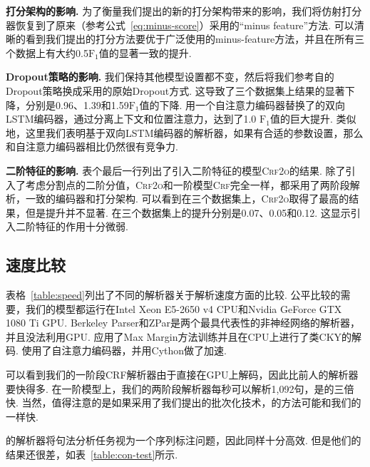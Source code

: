 \noindent\textbf{打分架构的影响.}
为了衡量我们提出的新的打分架构带来的影响，我们将仿射打分器恢复到了原来\citep{stern-etal-2017-minimal}（参考公式~\ref{eq:minus-score}）采用的``minus feature''方法.
可以清晰的看到我们提出的打分方法要优于广泛使用的minus-feature方法，并且在所有三个数据上有大约0.5$\mathrm{F}_1$值的显著一致的提升.

\noindent\textbf{Dropout策略的影响.}
我们保持其他模型设置都不变，然后将我们参考自\citep{dozat-etal-2017-biaffine}的Dropout策略换成\citep{stern-etal-2017-minimal}采用的原始Dropout方式.
这导致了三个数据集上结果的显著下降，分别是0.96、1.39和1.59$\mathrm{F}_1$值的下降.
\citep{kitaev-klein-2018-constituency}用一个自注意力编码器替换了\citep{stern-etal-2017-minimal}的双向LSTM编码器，通过分离上下文和位置注意力，达到了1.0 $\mathrm{F}_1$值的巨大提升.
类似地，这里我们表明基于双向LSTM编码器的解析器，如果有合适的参数设置，那么和自注意力编码器相比仍然很有竞争力.

\noindent\textbf{二阶特征的影响.}
表个最后一行列出了引入二阶特征的模型\textsc{Crf2o}的结果.
除了引入了考虑分割点的二阶分值，\textsc{Crf2o}和一阶模型\textsc{Crf}完全一样，都采用了两阶段解析，一致的编码器和打分架构.
可以看到在三个数据集上，\textsc{Crf2o}取得了最高的结果，但是提升并不显著.
在三个数据集上的提升分别是0.07、0.05和0.12.
这显示引入二阶特征的作用十分微弱.



\subsection{速度比较}
表格~\ref{table:speed}列出了不同的解析器关于解析速度方面的比较.
公平比较的需要，我们的模型都运行在Intel Xeon E5-2650 v4 CPU和Nvidia GeForce GTX 1080 Ti GPU.
Berkeley Parser和ZPar是两个最具代表性的非神经网络的解析器，并且没法利用GPU.
\citep{stern-etal-2017-minimal}应用了Max Margin方法训练并且在CPU上进行了类CKY的解码.
\citep{kitaev-klein-2018-constituency}使用了自注意力编码器，并用Cython做了加速.

可以看到我们的一阶段CRF解析器由于直接在GPU上解码，因此比前人的解析器要快得多.
在一阶模型上，我们的两阶段解析器每秒可以解析1,092句，是\citep{kitaev-klein-2018-constituency}的三倍快.
当然，值得注意的是如果采用了我们提出的批次化技术，\citep{stern-etal-2017-minimal,kitaev-klein-2018-constituency}的方法可能和我们的一样快.

\citep{gomez-rodriguez-vilares-2018-constituent}的解析器将句法分析任务视为一个序列标注问题，因此同样十分高效.
但是他们的结果还很差，如表~\ref{table:con-test}所示.

